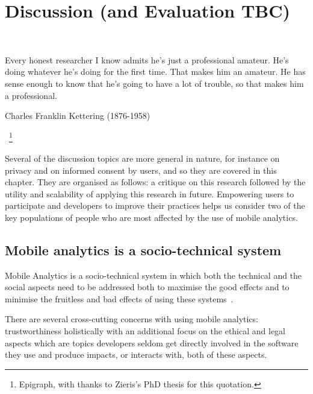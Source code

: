 \setchapterpreamble[u]{\margintoc}
\chapter{Discussion (and Evaluation TBC)}~\label{chapter-discussion}

\epigraph{Every honest researcher I know admits he's just a professional amateur. He's doing whatever he's doing for the first time. That makes him an amateur. He has sense enough to know that he's going to have a lot of trouble, so that makes him a professional.}{Charles Franklin Kettering (1876-1958)}~\footnote{Epigraph, with thanks to Zieris's PhD thesis for this quotation\cite{zieris2020_phd_qualitative_analysis_of_knowledge_transfer_in_pair_programming}.}


Several of the discussion topics are more general in nature, for instance on privacy and on informed consent by users, and so they are covered in this chapter. They are organised as follows: a critique on this research followed by the utility and scalability of applying this research in future. Empowering users to participate and developers to improve their practices helps us consider two of the key populations of people who are most affected by the use of mobile analytics. 




\section{Mobile analytics is a socio-technical system}
Mobile Analytics is a socio-technical system in which both the technical and the social aspects need to be addressed both to maximise the good effects and to minimise the fruitless and bad effects of using these systems~.

There are several cross-cutting concerns with using mobile analytics: trustworthiness holistically with an additional focus on the ethical and legal aspects which are topics developers seldom get directly involved in the software they use and produce impacts, or interacts with, both of these aspects.

